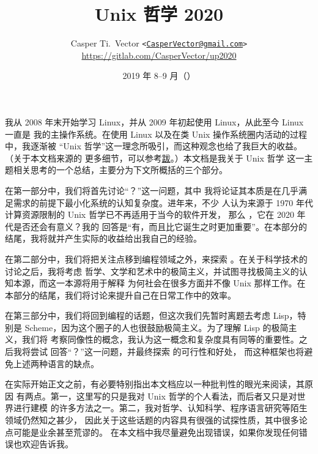 \documentclass[UTF8]{ctexart}
\begin{document}
\title{\textbf{Unix 哲学 2020}}
\author{%
	Casper Ti.\ Vector
	\texttt{<\url{CasperVector@gmail.com}>}\\
	\url{https://gitlab.com/CasperVector/up2020}%
}
\date{2019 年 8--9 月（\docversion）}
\maketitle
\vspace{\baselineskip}
\tableofcontents


我从 2008 年末开始学习 Linux，并从 2009 年初起使用 Linux，从此至今 Linux 一直是
我的主操作系统。在使用 Linux 以及在类 Unix 操作系统圈内活动的过程中，我逐渐被
“Unix 哲学”这一理念所吸引，而这种观念也给了我巨大的收益。（关于本文档来源的
更多细节，可以参考\hyperref[sec:afterword]{跋}。）本文档是我关于 Unix 哲学
这一主题相关思考的一个总结，主要分为下文所概括的三个部分。

在第一部分中，我们将首先讨论“？”这一问题，其中
我将论证其本质是在几乎满足需求的前提下最小化系统的认知复杂度。进年来，不少
人认为来源于 1970 年代计算资源限制的 Unix 哲学已不再适用于当今的软件开发，
那么 ，它在 2020 年代是否还会有意义？我的
回答是“有，而且比它诞生之时更加重要”。在本部分的结尾，我将就并产生实际的收益给出我自己的经验。

在第二部分中，我们将把关注点移到编程领域之外，来探索 。在关于科学技术的讨论之后，我将考虑
哲学、文学和艺术中的极简主义，并试图寻找极简主义的认知本源，而这一本源将用于解释
为何社会在很多方面并不像 Unix 那样工作。在本部分的结尾，我们将讨论来提升自己在日常工作中的效率。

在第三部分中，我们将回到编程的话题，但这次我们先暂时离题去考虑 Lisp，特别是
Scheme，因为这个圈子的人也很鼓励极简主义。为了理解 Lisp 的极简主义，我们将
考察同像性的概念，我认为这一概念和复杂度具有同等的重要性。之后我将尝试
回答“？”这一问题，并最终探索%
的可行性和好处，
而这种框架也将避免上述两种语言的缺点。

在实际开始正文之前，有必要特别指出本文档应以一种批判性的眼光来阅读，其原因
有两点。第一，这里写的只是我对 Unix 哲学的个人看法，而后者又只是对世界进行建模
的许多方法之一。第二，我对哲学、认知科学、程序语言研究等陌生领域仍然知之甚少，
因此关于这些话题的内容具有很强的试探性质，其中很多论点可能是业余甚至荒谬的。
在本文档中我尽量避免出现错误，如果你发现任何错误也欢迎告诉我。
\end{document}
